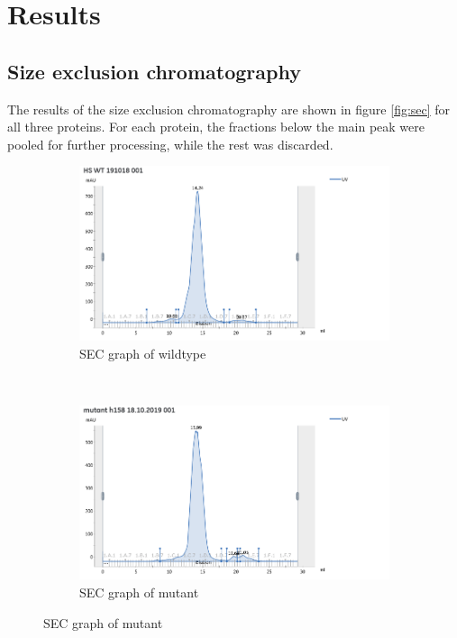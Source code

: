 \chapter{Results}

\section{Size exclusion chromatography}

The results of the size exclusion chromatography are shown in figure
\ref{fig:sec} for all three proteins. For each protein, the fractions below the
main peak were pooled for further processing, while the rest was discarded.

\begin{figure}
    \centering
    \begin{subfigure}{0.45\textwidth}
        \includegraphics[width=\textwidth]{img/sec_wt}
        \caption{SEC graph of wildtype}
        \label{fig:sec_wt}
    \end{subfigure}
    ~
    \begin{subfigure}{0.45\textwidth}
        \includegraphics[width=\textwidth]{img/sec_mut}
        \caption{SEC graph of mutant}
        \label{fig:sec_mut}
    \end{subfigure}


\end{figure}
